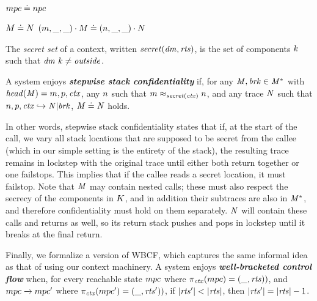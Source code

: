 \documentclass[acmsmall,review,anonymous]{acmart}\settopmatter{printfolios=true,printccs=false,printacmref=false}
\begin{document}
{{\begin{minipage}{.3\textwidth}
\judgment{}
         {\(mpc \doteq npc\)}
\end{minipage}
\begin{minipage}{.6\textwidth}
\judgmenttwo{\(\mach, \pi_\mach(\head(\machT)) \diamond \nach, \pi_\mach(\head(\nachT))\)}
            {\(M \doteq N\)}
            {\((m,\mbox{\_},\mbox{\_}) \cdot M \doteq (n,\mbox{\_},\mbox{\_}) \cdot N\)}
\end{minipage}

The \emph{secret set} of a context, written \(\mathit{secret}(\mathit{dm},\mathit{rts})\), is the
set of components \(k\) such that \(\mathit{dm} ~ k \not = \mathit{outside}\).

A system enjoys \textbf{\textit{stepwise stack confidentiality}} if,
for any \(\mathit{M},\mathit{brk} \in \mathit{M}^*\) with \(\mathit{head}(\mathit{M}) = m,p,\mathit{ctx}\),
any \(n\) such that \(m \approx_{\mathit{secret}(\mathit{ctx})} n\), and any trace
\(\mathit{N}\) such that \(n,p,\mathit{ctx} \hookrightarrow \mathit{N} | \mathit{brk}\),
\(\mathit{M} \doteq \mathit{N}\) holds.


In other words, stepwise stack confidentiality states that if, at the start of the call,
we vary all stack locations that are supposed to be secret from the callee
(which in our simple setting is the entirety of the stack),
the resulting trace remains in lockstep with the original trace
until either both return together or one failstops. This implies that
if the callee reads a secret location, it must failstop.
%
Note that \(\mathit{M}\) may contain nested calls; these must also respect the secrecy
of the components in \(K\), and in addition their subtraces are also in
\(\mathit{M}^*\), and therefore confidentiality must hold on them separately. \(\mathit{N}\)
will contain these calls and returns as well, so its return stack pushes and pops
in lockstep until it breaks at the final return.

Finally, we formalize a version of WBCF, which captures the same informal idea
as that of \citet{SkorstengaardSTKJFP} using our context machinery.
A system enjoys \textit{\textbf{well-bracketed control flow}} when, for every reachable state
\(mpc\) where \(\pi_{\mathit{ctx}}(mpc) = (\mbox{\_},\mathit{rts}))\), and
\(mpc \xrightarrow{} mpc'\) where \(\pi_{\mathit{ctx}}(mpc') = (\mbox{\_},\mathit{rts}'))\),
if \(|\mathit{rts}'| < |\mathit{rts}|\), then \(|\mathit{rts}'| = |\mathit{rts}|-1\).

}}
\end{document}
